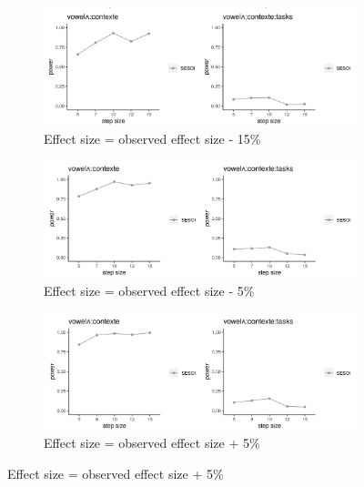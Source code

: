 \documentclass[12 pt]{article}
\begin{document}
\begin{figure} \label{figure_power_analysis_f2}
	\centering
	\begin{subfigure}[t]{0.8\textwidth}
		\centering
		\includegraphics[width=\textwidth]{powerplot_f2_minus15} 
		\caption{Effect size = observed effect size - 15\%} \label{f2_minus15}
	\end{subfigure}
	
	\begin{subfigure}[t]{0.8\textwidth}
		\centering
		\includegraphics[width=\textwidth]{powerplot_f2_minus5} 
		\caption{Effect size = observed effect size - 5\%} \label{f2_minus5}
	\end{subfigure}
	
	
	\begin{subfigure}[t]{0.8\textwidth}
		\centering
		\includegraphics[width=\textwidth]{powerplot_f2_plus5} 
		\caption{Effect size = observed effect size + 5\%} \label{f2_plus5}
	\end{subfigure}
	

\end{figure}
\end{document}
